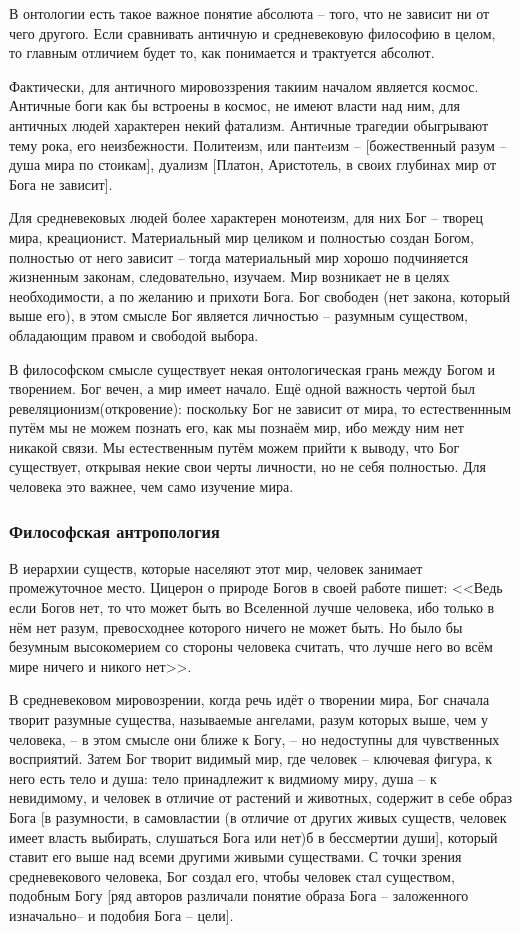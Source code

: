 \documentclass[a4paper, 12pt]{book} %
\begin{document}
В онтологии есть такое важное понятие абсолюта -- того, что не зависит ни от чего другого. Если сравнивать античную и средневековую философию в целом, то главным отличием будет то, как понимается и трактуется абсолют.

Фактически, для античного мировоззрения такиим началом является космос. Античные боги как бы встроены в космос, не имеют власти над ним, для античных людей характерен некий фатализм. Античные трагедии обыгрывают тему рока, его неизбежности. Политеизм, или пантeизм -- [божественный разум -- душа мира по стоикам], дуализм [Платон, Аристотель, в своих глубинах мир от Бога не зависит].

Для средневековых людей более характерен монотеизм, для них Бог -- творец мира, креационист. Материальный мир целиком и полностью создан Богом, полностью от него зависит -- тогда материальный мир хорошо подчиняется жизненным законам, следовательно, изучаем. Мир возникает не в целях необходимости, а по желанию и прихоти Бога. Бог свободен (нет закона, который выше его), в этом смысле Бог является личностью -- разумным существом, обладающим правом и свободой выбора.

В философском смысле существует некая онтологическая грань между Богом и творением. Бог вечен, а мир имеет начало. 
Ещё одной важность чертой был ревеляционизм(откровение): поскольку Бог не зависит от мира, то естественнным путём мы не можем познать его, как мы познаём мир, ибо между ним нет никакой связи. Мы естественным путём можем прийти к выводу, что Бог существует, открывая некие свои черты личности, но не себя полностью. Для человека это важнее, чем само изучение мира. 
 
 
\subsubsection{Философская антропология}
В иерархии существ, которые населяют этот мир, человек занимает промежуточное место. Цицерон о природе Богов в своей работе пишет: <<Ведь если Богов нет, то что может быть во Вселенной лучше человека, ибо только в нём нет разум, превосходнее которого ничего не может быть. Но было бы безумным высокомерием со стороны человека считать, что лучше него во всём мире ничего и никого нет>>. 

В средневековом мировозрении, когда речь идёт о творении мира, Бог сначала творит разумные существа, называемые ангелами, разум которых выше, чем у человека, --  в этом смысле они ближе к Богу, -- но недоступны для чувственных восприятий. Затем Бог творит видимый мир, где человек -- ключевая фигура, к него есть тело и душа: тело принадлежит к видмиому миру, душа -- к невидимому, и человек в отличие от растений и животных, содержит в себе образ Бога [в разумности, в самовластии (в отличие от других живых существ, человек имеет власть выбирать, слушаться Бога или нет)б в бессмертии души], который ставит его выше над всеми другими живыми существами. С точки зрения средневекового человека, Бог создал его, чтобы человек стал существом, подобным Богу [ряд авторов различали понятие образа Бога -- заложенного изначально-- и подобия Бога -- цели]. 
\end{document}
